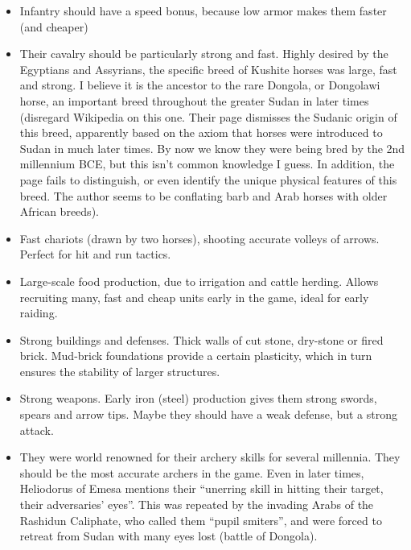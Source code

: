 \documentclass[a4paper,12pt]{scrreprt}
\begin{document}
\begin{itemize}
	\item Infantry should have a speed bonus, because low armor makes them faster (and cheaper)

	\item Their cavalry should be particularly strong and fast. Highly desired by the Egyptians and Assyrians, the specific breed of Kushite horses was large, fast and strong. I believe it is the ancestor to the rare Dongola, or Dongolawi horse, an important breed throughout the greater Sudan in later times (disregard Wikipedia on this one. Their page dismisses the Sudanic origin of this breed, apparently based on the axiom that horses were introduced to Sudan in much later times. By now we know they were being bred by the 2nd millennium BCE, but this isn’t common knowledge I guess. In addition, the page fails to distinguish, or even identify the unique physical features of this breed. The author seems to be conflating barb and Arab horses with older African breeds).

	\item Fast chariots (drawn by two horses), shooting accurate volleys of arrows. Perfect for hit and run tactics.

	\item Large-scale food production, due to irrigation and cattle herding. Allows recruiting many, fast and cheap units early in the game, ideal for early raiding.

	\item Strong buildings and defenses. Thick walls of cut stone, dry-stone or fired brick. Mud-brick foundations provide a certain plasticity, which in turn ensures the stability of larger structures.

	\item Strong weapons. Early iron (steel) production gives them strong swords, spears and arrow tips. Maybe they should have a weak defense, but a strong attack.

	\item They were world renowned for their archery skills for several millennia. They should be the most accurate archers in the game. Even in later times, Heliodorus of Emesa mentions their “unerring skill in hitting their target, their adversaries’ eyes”. This was repeated by the invading Arabs of the Rashidun Caliphate, who called them “pupil smiters”, and were forced to retreat from Sudan with many eyes lost (battle of Dongola).  
\end{itemize}
\end{document}
